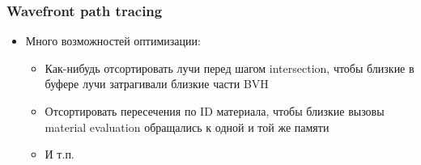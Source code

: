 \documentclass[10pt]{beamer}
\begin{document}
\begin{frame}[fragile]
\frametitle{Wavefront path tracing}
\begin{itemize}
\item Много возможностей оптимизации:
\pause
\begin{itemize}
\item Как-нибудь отсортировать лучи перед шагом intersection, чтобы близкие в буфере лучи затрагивали близкие части BVH
\pause
\item Отсортировать пересечения по ID материала, чтобы близкие вызовы material evaluation обращались к одной и той же памяти
\pause
\item И т.п.
\end{itemize}
\end{itemize}
\end{frame}
\end{document}
